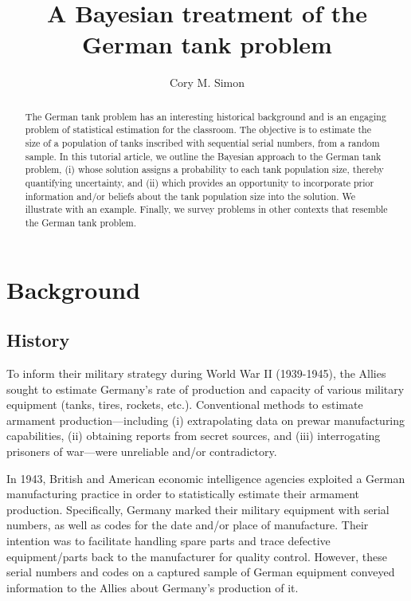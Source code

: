\documentclass[11pt, oneside]{article}
\title{A Bayesian treatment of the German tank problem}
\author[1]{Cory M. Simon}
\affil[1]{School of Chemical, Biological, and Environmental Engineering. Oregon State University. Corvallis, OR. USA. }
\affil[]{\texttt{cory.simon@oregonstate.edu}}
\begin{document}
\maketitle

\begin{abstract}
	The German tank problem has an interesting historical background and is an engaging problem of statistical estimation for the classroom. The objective is to estimate the size of a population of tanks inscribed with sequential serial numbers, from a random sample. In this tutorial article, we outline the Bayesian approach to the German tank problem, (i) whose solution assigns a probability to each tank population size, thereby quantifying uncertainty, and (ii) which provides an opportunity to incorporate prior information and/or beliefs about the tank population size into the solution. We illustrate with an example. Finally, we survey problems in other contexts that resemble the German tank problem.
\end{abstract}

\clearpage

\section{Background}

\subsection{History}
To inform their military strategy during World War II (1939-1945), the Allies sought to estimate Germany's rate of production and capacity of various military equipment (tanks, tires, rockets, etc.).
Conventional methods to estimate armament production---including 
(i) extrapolating data on prewar manufacturing capabilities, 
(ii) obtaining reports from secret sources, and 
(iii) interrogating prisoners of war---were unreliable and/or contradictory. 

In 1943, British and American economic intelligence agencies exploited a German manufacturing practice in order to statistically estimate their armament production. 
Specifically, Germany marked their military equipment with serial numbers, as well as codes for the date and/or place of manufacture. Their intention was to facilitate handling spare parts and trace defective equipment/parts back to the manufacturer for quality control.
However, these serial numbers and codes on a captured sample of German equipment conveyed information to the Allies about Germany's production of it.
\end{document}
